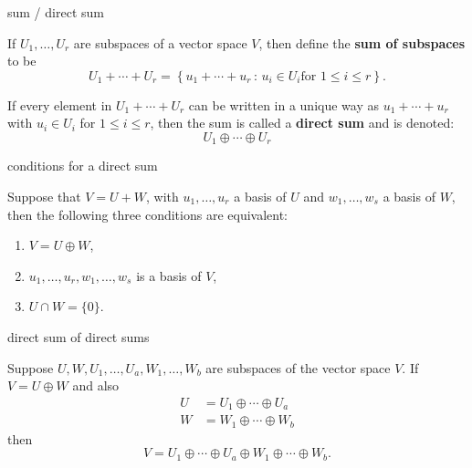\documentclass[avery5371,grid]{flashcards}
\renewcommand{\le}{\leqslant}
\newcommand{\set}[2]{\ensuremath{\left\{ #1 \, : \, #2 \right\}}}
\newcommand{\defn}[1]{\textbf{#1}}
\begin{document}
\begin{flashcard}[Definition]{sum / direct sum}

  If $U_1, \ldots, U_r$ are subspaces of a vector space $V$, then
  define the \defn{sum of subspaces} to be
  \[
    U_1 + \cdots + U_r = \set{u_1 + \cdots + u_r}{u_i \in U_i \text{
        for } 1 \le i \le r}.
  \]
  \vfill

  If every element in $U_1 + \cdots + U_r$ can be written in a unique
  way as $u_1 + \cdots + u_r$ with $u_i \in U_i$ for $1 \le i \le r$,
  then the sum is called a \defn{direct sum} and is denoted:
  \[
    U_1 \oplus \cdots \oplus U_r
  \]

\end{flashcard}

\begin{flashcard}[Theorem 2.9]{conditions for a direct sum}

  Suppose that $V = U + W$, with $u_1, \ldots, u_r$ a basis of $U$ and
  $w_1, \ldots, w_s$ a basis of $W$, then the following three
  conditions are equivalent:
  \begin{enumerate}
  \item $V = U \oplus W$,
  \item $u_1, \ldots, u_r, w_1, \ldots, w_s$ is a basis of $V$,
  \item $U \cap W = \{ 0 \}$.
  \end{enumerate}

\end{flashcard}

\begin{flashcard}[Theorem 2.10]{direct sum of direct sums}

  Suppose $U, W, U_1, \ldots, U_a, W_1, \ldots, W_b$ are subspaces of
  the vector space $V$. If $V = U \oplus W$ and also
  \begin{align*}
    U &= U_1 \oplus \cdots \oplus U_a \\
    W &= W_1 \oplus \cdots \oplus W_b
  \end{align*}
  then
  \[
    V = U_1 \oplus \cdots \oplus U_a\oplus W_1 \oplus \cdots \oplus W_b.
  \]

\end{flashcard}
\end{document}
